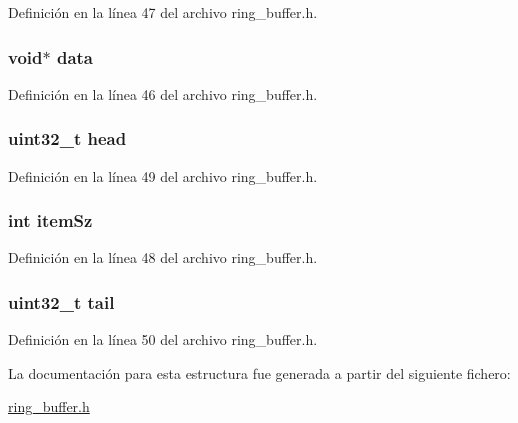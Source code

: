 Definición en la línea 47 del archivo ring\+\_\+buffer.\+h.

\subsubsection[{\texorpdfstring{data}{data}}]{\setlength{\rightskip}{0pt plus 5cm}void$\ast$ data}\hypertarget{struct_r_i_n_g_b_u_f_f___t_a735984d41155bc1032e09bece8f8d66d}{}\label{struct_r_i_n_g_b_u_f_f___t_a735984d41155bc1032e09bece8f8d66d}


Definición en la línea 46 del archivo ring\+\_\+buffer.\+h.

\subsubsection[{\texorpdfstring{head}{head}}]{\setlength{\rightskip}{0pt plus 5cm}uint32\+\_\+t head}\hypertarget{struct_r_i_n_g_b_u_f_f___t_ac8143ecb1dda85e708e5252e0106dd13}{}\label{struct_r_i_n_g_b_u_f_f___t_ac8143ecb1dda85e708e5252e0106dd13}


Definición en la línea 49 del archivo ring\+\_\+buffer.\+h.

\subsubsection[{\texorpdfstring{item\+Sz}{itemSz}}]{\setlength{\rightskip}{0pt plus 5cm}int item\+Sz}\hypertarget{struct_r_i_n_g_b_u_f_f___t_a674989c87ac831d9e5a28faf3bd1545c}{}\label{struct_r_i_n_g_b_u_f_f___t_a674989c87ac831d9e5a28faf3bd1545c}


Definición en la línea 48 del archivo ring\+\_\+buffer.\+h.

\subsubsection[{\texorpdfstring{tail}{tail}}]{\setlength{\rightskip}{0pt plus 5cm}uint32\+\_\+t tail}\hypertarget{struct_r_i_n_g_b_u_f_f___t_a3da51da0aebd2ac8b1ab802259126311}{}\label{struct_r_i_n_g_b_u_f_f___t_a3da51da0aebd2ac8b1ab802259126311}


Definición en la línea 50 del archivo ring\+\_\+buffer.\+h.



La documentación para esta estructura fue generada a partir del siguiente fichero\+:\begin{DoxyCompactItemize}
\item 
\hyperlink{ring__buffer_8h}{ring\+\_\+buffer.\+h}\end{DoxyCompactItemize}
